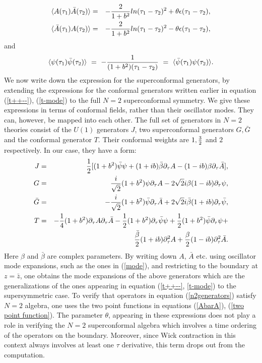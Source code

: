 \documentclass[a4paper,12pt]{article}
\begin{document}
\begin{eqnarray}
\langle A(\tau_1) \bar{A}(\tau_2) \rangle  & = 
& -{2\over 1 + b^2} ln(\tau_1 - \tau_2)^2
  + \theta \epsilon(\tau_1 - \tau_2), \nonumber \\
\langle \bar{A}(\tau_1) A(\tau_2) \rangle & = 
& -{2\over 1 + b^2} ln(\tau_1 - \tau_2)^2
                           - \theta \epsilon(\tau_1 - \tau_2), 
\label{AbarA}
\end{eqnarray}
and 
\begin{equation}  
\langle \psi(\tau_1) \bar{\psi}(\tau_2) \rangle  ~ = ~ -{1\over (1+ b^2)(\tau_1
  -\tau_2)} ~ = ~ \langle \bar{\psi}(\tau_1) \psi(\tau_2) \rangle .
\label{two point function}
\end{equation}
We now write down the expression for the superconformal generators,
by extending the expressions for the conformal generators written 
earlier in equation (\ref{t++--}), (\ref{t-mode}) 
to the full $N=2$ superconformal symmetry. 
We give these expressions in terms of 
conformal fields, rather than their oscillator modes. They can,
however, be mapped into each other. The full set of generators
in $N=2$ theories consist of the $U(1)$ generators $J$, two 
superconformal generators $G, \bar{G}$ and the conformal generator
$T$. Their conformal weights are $1, {3\over 2}$ and 
$2$ respectively. In our case, they have a form:
\begin{eqnarray}
J & = & {1\over 2}[(1+b^2){\bar{\psi}\psi} + (1+ i b)\bar{\beta}
\partial_{\tau} A - 
(1- i b)\beta\partial_{\tau} \bar{A}], \nonumber \\
G & = & {i\over \sqrt{2}} (1 + b^2) \psi\partial_{\tau} A - 
 2\sqrt{2} i \beta (1- i b)
 \partial_{\tau} \psi, \nonumber \\
\bar{G} & = & - {i\over \sqrt{2}} (1+b^2) \bar{\psi}\partial_{\tau} 
\bar{A} + 2\sqrt{2} i \bar{\beta} (1+ i b)
\partial_{\tau} \bar{\psi},\nonumber \\
T & = & -{1\over 4} (1+ b^2)\partial_{\tau} A 
          \partial_{\tau} {\bar{A}} 
         - {1\over 2} (1 + b^2) \partial_{\tau}\bar{\psi}\psi 
         + {1\over 2} (1 + b^2)\bar{\psi}\partial_{\tau}\psi + \nonumber \\
& & {\bar{\beta}\over 2}(1+ i b)\partial_{\tau}^2 A
         +{{\beta}\over 2}(1 - i b)\partial_{\tau}^2 \bar{A}.
\label{n2generators}
\end{eqnarray}
Here $\beta$ and $\bar{\beta}$ are complex parameters. 
By writing down 
$A$, $\bar{A}$ etc. using oscillator mode expansions, such as 
the ones in (\ref{mode}), and restricting to the boundary 
at $z = \bar z$, 
one obtains the mode expansions of the 
above generators which are the generalizations of the ones appearing
in equation (\ref{t++--}, \ref{t-mode}) to the supersymmetric case.  
To verify that operators in equation 
(\ref{n2generators}) satisfy $N=2$  
algebra, one uses the two point functions in 
equations (\ref{AbarA}), (\ref{two point function}). 
The parameter $\theta$, appearing in these expressions  
does not play a 
role in verifying the $N=2$ superconformal algebra which involves a time 
ordering of the operators on the boundary. Moreover, since 
Wick contraction in this context always involves at least one
$\tau$ derivative, this term drops out from the computation.
\end{document}
